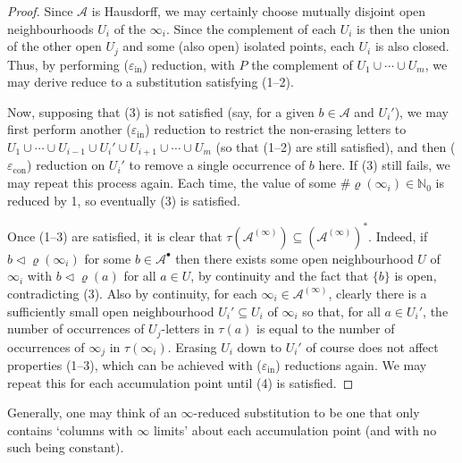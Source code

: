 \documentclass[11pt]{amsart}
\numberwithin{equation}{section}
\theoremstyle{plain}
\theoremstyle{definition}
\newcommand{\N}{{\mathbb N}}
\newcommand{\mc}{\mathcal}
\newcommand{\A}{\mc A}
\newcommand{\sub}{\varrho}
\begin{document}
\begin{proof}
Since \(\A\) is Hausdorff, we may certainly choose mutually disjoint open neighbourhoods \(U_i\) of the \(\infty_i\). Since the complement of each \(U_i\) is then the union of the other open \(U_j\) and some (also open) isolated points, each \(U_i\) is also closed. Thus, by performing (\(\varepsilon_\mathrm{in}\)) reduction, with \(P\) the complement of \(U_1 \cup \cdots \cup U_m\), we may derive reduce to a substitution satisfying (1--2).

Now, supposing that (3) is not satisfied (say, for a given \(b \in \A\) and \(U_i'\)), we may first perform another (\(\varepsilon_\mathrm{in}\)) reduction to restrict the non-erasing letters to \(U_1 \cup \cdots \cup U_{i-1} \cup U_i' \cup U_{i+1} \cup \cdots \cup U_m\) (so that (1--2) are still satisfied), and then (\(\varepsilon_\mathrm{con}\)) reduction on \(U_i'\) to remove a single occurrence of \(b\) here. If (3) still fails, we may repeat this process again. Each time, the value of some \(\# \sub(\infty_i) \in \N_0\) is reduced by 1, so eventually (3) is satisfied.

Once (1--3) are satisfied, it is clear that \(\tau(\A^{(\infty)}) \subseteq (\A^{(\infty)})^\ast\). Indeed, if \(b \triangleleft \sub(\infty_i)\) for some \(b \in \A^\bullet\) then there exists some open neighbourhood \(U\) of \(\infty_i\) with \(b \triangleleft \sub(a)\) for all \(a \in U\), by continuity and the fact that \(\{b\}\) is open, contradicting (3). Also by continuity, for each \(\infty_i \in \A^{(\infty)}\), clearly there is a sufficiently small open neighbourhood \(U_i' \subseteq U_i\) of \(\infty_i\) so that, for all \(a \in U_i'\), the number of occurrences of \(U_j\)-letters in \(\tau(a)\) is equal to the number of occurrences of \(\infty_j\) in \(\tau(\infty_i)\). Erasing \(U_i\) down to \(U_i'\) of course does not affect properties (1--3), which can be achieved with (\(\varepsilon_\mathrm{in}\)) reductions again. We may repeat this for each accumulation point until (4) is satisfied.
\end{proof}

Generally, one may think of an \(\infty\)-reduced substitution to be one that only contains `columns with \(\infty\) limits' about each accumulation point (and with no such being constant).
\end{document}
